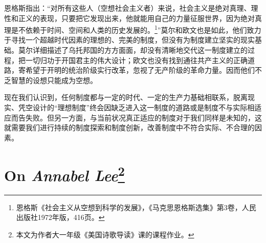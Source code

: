 \par 恩格斯指出：“对所有这些人（空想社会主义者）来说，社会主义是绝对真理、理性和正义的表现，只要把它发现出来，他就能用自己的力量征服世界，因为绝对真理是不依赖于时间、空间和人类的历史发展的。\footnote{恩格斯《社会主义从空想到科学的发展》，《马克思恩格斯选集》第3卷，人民出版社1972年版，416页。}”莫尔和欧文也是如此，他们致力于寻找一个超越时代因素的理想的、完美的制度，但没有为制度建立坚实的现实基础。莫尔详细描述了乌托邦国的方方面面，却没有清晰地交代这一制度建立的过程，把一切归功于开国君主的伟大设计；欧文也没有找到通往共产主义的正确道路，寄希望于开明的统治阶级实行改革，忽视了无产阶级的革命力量。因而他们不乏智慧的设想只能成为空想。
\par 现在我们认识到，任何制度都与一定的时代、一定的生产力基础相联系，脱离现实、凭空设计的“理想制度”终会因缺乏进入这一制度的道路或是制度不与实际相适应而告失败。但另一方面，与当前状况真正适应的制度对于我们同样是未知的，这就需要我们进行持续的制度探索和制度创新，改善制度中不符合实际、不合理的因素。
\par {}

\setlength{\parindent}{0em}
\section*{On \emph{Annabel Lee}\footnote{本文为作者大一年级《美国诗歌导读》课的课程作业。}}

